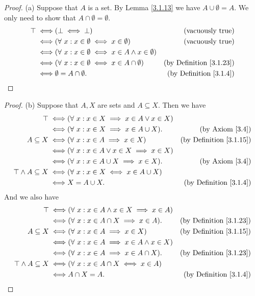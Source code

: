 \begin{proof}{(a)}
Suppose that \(A\) is a set.
By Lemma \ref{3.1.13} we have \(A \cup \emptyset = A\).
We only need to show that \(A \cap \emptyset = \emptyset\).
\begin{align*}
\top \iff & (\bot \iff \bot) & \text{(vacuously true)} \\
\iff & (\forall\ x : x \in \emptyset \iff x \in \emptyset) & \text{(vacuously true)} \\
\iff & (\forall\ x : x \in \emptyset \iff x \in A \land x \in \emptyset) \\
\iff & (\forall\ x : x \in \emptyset \iff x \in A \cap \emptyset) & \text{(by Definition \ref{3.1.23})} \\
\iff & \emptyset = A \cap \emptyset. & \text{(by Definition \ref{3.1.4})}
\end{align*}
\end{proof}

\begin{proof}{(b)}
Suppose that \(A, X\) are sets and \(A \subseteq X\).
Then we have
\begin{align*}
\top \iff & (\forall\ x : x \in X \implies x \in A \lor x \in X) \\
\iff & (\forall\ x : x \in X \implies x \in A \cup X). & \text{(by Axiom \ref{3.4})} \\
A \subseteq X \iff & (\forall\ x : x \in A \implies x \in X) & \text{(by Definition \ref{3.1.15})} \\
\iff & (\forall\ x : x \in A \lor x \in X \implies x \in X) \\
\iff & (\forall\ x : x \in A \cup X \implies x \in X). & \text{(by Axiom \ref{3.4})} \\
\top \land A \subseteq X \iff & (\forall\ x : x \in X \iff x \in A \cup X) \\
\iff & X = A \cup X. & \text{(by Definition \ref{3.1.4})}
\end{align*}
And we also have
\begin{align*}
\top \iff & (\forall\ x : x \in A \land x \in X \implies x \in A) \\
\iff & (\forall\ x : x \in A \cap X \implies x \in A). & \text{(by Definition \ref{3.1.23})} \\
A \subseteq X \iff & (\forall\ x : x \in A \implies x \in X) & \text{(by Definition \ref{3.1.15})} \\
\iff & (\forall\ x : x \in A \implies x \in A \land x \in X) \\
\iff & (\forall\ x : x \in A \implies x \in A \cap X). & \text{(by Definition \ref{3.1.23})} \\
\top \land A \subseteq X \iff & (\forall\ x : x \in A \cap X \iff x \in A) \\
\iff & A \cap X = A. & \text{(by Definition \ref{3.1.4})}
\end{align*}
\end{proof}

